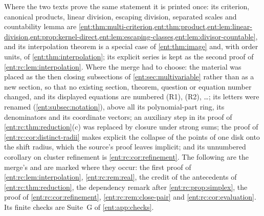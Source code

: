 \documentclass[11pt]{article}
\theoremstyle{plain}
\theoremstyle{plain}
\theoremstyle{plain}
\theoremstyle{definition}
\theoremstyle{definition}
\theoremstyle{definition}
\theoremstyle{definition}
\theoremstyle{remark}
\begin{document}
Where the two texts prove the same statement it is printed once: its
criterion, canonical products, linear division, escaping division, separated
scales and countability lemma are
\cref{ent:thm:multi-criterion,ent:thm:product,ent:lem:linear-division,ent:prop:kernel-direct,ent:lem:escaping-classes,ent:lem:divisor-countable},
and its interpolation theorem is a special case of \cref{ent:thm:image} and,
with order units, of \cref{ent:thm:interpolation}; its explicit series is kept
as the second proof of \cref{ent:rc:lem:interpolation}. Where the merge had
to choose: the material was placed as the then closing subsections of
\cref{ent:sec:multivariable} rather than as a new section, so that no existing
section, theorem, question or equation number changed, and its displayed
equations are numbered (R1), (R2), \ldots; its letters were renamed
(\cref{ent:subsec:notation}), above all its polynomial-part ring, its
denominators and its coordinate vectors; an auxiliary step in its proof of
\cref{ent:rc:thm:reduction}(c) was replaced by closure under strong sums; the
proof of \cref{ent:rc:cor:distinct-radii} makes explicit the collapse of the
points of one disk onto the shift radius, which the source's proof leaves
implicit; and its unnumbered corollary on cluster refinement is
\cref{ent:rc:cor:refinement}. The following are the merge's and are marked
where they occur: the first proof of \cref{ent:rc:lem:interpolation},
\cref{ent:rc:rem:real}, the credit of the antecedents of
\cref{ent:rc:thm:reduction}, the dependency remark after
\cref{ent:rc:prop:simplex}, the proof of \cref{ent:rc:cor:refinement},
\cref{ent:rc:rem:close-pair} and \cref{ent:rc:cor:evaluation}. Its finite
checks are Suite~G of \cref{ent:app:checks}.
\end{document}
